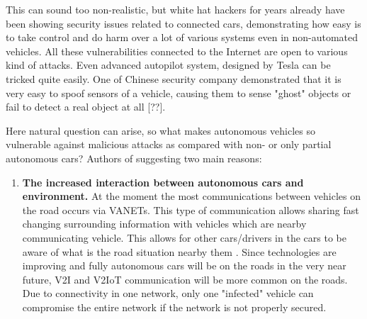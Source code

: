 This can sound too non-realistic, but white hat hackers for years already have been showing security issues related to connected cars, demonstrating how easy is to take control and do harm over a lot of various systems even in non-automated vehicles. All these vulnerabilities connected to the Internet are open to various kind of attacks. Even advanced autopilot system, designed by Tesla can be tricked quite easily. One of Chinese security company demonstrated that it is very easy to spoof sensors of a vehicle, causing them to sense "ghost" objects or fail to detect a real object at all [??].

Here natural question can arise, so what makes autonomous vehicles so vulnerable against malicious attacks as compared with non- or only partial autonomous cars? Authors of \cite{sec} suggesting two main reasons:
\begin{enumerate}
	\item \textbf{The increased interaction between autonomous cars and environment.} At the moment the most communications between vehicles on the road occurs via \glspl{VANET}. This type of communication allows sharing fast changing surrounding information with vehicles which are nearby communicating vehicle. This allows for other cars/drivers in the cars to be aware of what is the road situation nearby them \cite{carspeak}. Since technologies are improving and fully autonomous cars will be on the roads in the very near future, \gls{V2I} and \gls{V2IoT} communication will be more common on the roads. Due to connectivity in one network, only one "infected" vehicle can compromise the entire network if the network is not properly secured.

\end{enumerate}
